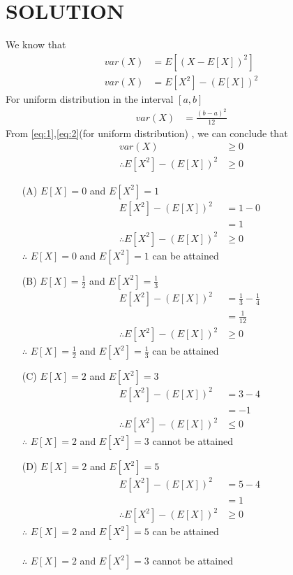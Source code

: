 \documentclass[journal,12pt,twocolumn]{IEEEtran}
\begin{document}
\section*{SOLUTION}
We know that
\begin{align}
var(X)&=E[(X-E[X])^2] \label{eq:1} \\
var(X)&=E[X^2]-(E[X])^2 \label{1}
\end{align}
For uniform distribution in the interval $[a,b]$
\begin{align}
var(X) &= \frac{{(b-a)}^2}{12} \label{eq:2}
\end{align}
From \eqref{eq:1},\eqref{eq:2}(for uniform distribution) , we can conclude that 
\begin{align}
var(X) & \geq 0 \label{2} \\
\therefore E[X^2]-(E[X])^2 & \geq 0 \label{3}
\end{align}
\begin{enumerate}
\item[(A)] $E[X]=0$ and $E[X^2]=1$
\begin{align}
E[X^2]-(E[X])^2 &=1 - 0\\
&=1\\
\therefore E[X^2]-(E[X])^2 &\geq 0
\end{align}
$\therefore$ $E[X]=0$ and $E[X^2]=1$ can be attained \\
\item[(B)] $E[X]=\frac{1}{2}$ and $E[X^2]=\frac{1}{3}$
\begin{align}
E[X^2]-(E[X])^2 &=\frac{1}{3} - \frac{1}{4}\\
&=\frac{1}{12}\\
\therefore E[X^2]-(E[X])^2 &\geq 0
\end{align}
$\therefore$ $E[X]=\frac{1}{2}$ and $E[X^2]=\frac{1}{3}$ can be attained \\
\item[(C)] $E[X]=2$ and $E[X^2]=3$
\begin{align}
E[X^2]-(E[X])^2 &=3 - 4\\
&=-1\\
\therefore E[X^2]-(E[X])^2 &\leq 0
\end{align}
$\therefore$ $E[X]=2$ and $E[X^2]=3$ cannot be attained \\
\item[(D)] $E[X]=2$ and $E[X^2]=5$
\begin{align}
E[X^2]-(E[X])^2 &=5 - 4\\
&=1\\
\therefore E[X^2]-(E[X])^2 &\geq 0
\end{align}
$\therefore$ $E[X]=2$ and $E[X^2]=5$ can be attained\\ \\
$\therefore$ $E[X]=2$ and $E[X^2]=3$ cannot be attained\\
\end{enumerate}
\end{document}
